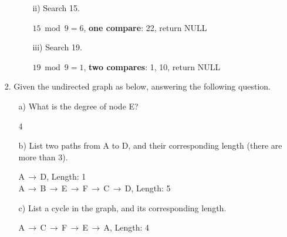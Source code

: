 \documentclass{article}
\begin{document}
\begin{itemize}
\begin{itemize}
\begin{itemize}
            \item[ii)] Search 15.

            $15\bmod{9}=6$, \textbf{one compare}: 22, return NULL
            
            \item[iii)] Search 19.

            $19\bmod{9}=1$, \textbf{two compares}: 1, 10, return NULL
            
        \end{itemize}
    \end{itemize}
    \item[2.] Given the undirected graph as below, answering the following question.
    \begin{center}
    \end{center}
    \begin{itemize}
        \item[a)] What is the degree of node E?

        4
        
        \item[b)] List two paths from A to D, and their corresponding length (there are more than 3).

        A$\,\to\,$D, Length: 1\\
        A$\,\to\,$B$\,\to\,$E$\,\to\,$F$\,\to\,$C$\,\to\,$D, Length: 5        
        \item[c)] List a cycle in the graph, and its corresponding length.

        A$\,\to\,$C$\,\to\,$F$\,\to\,$E$\,\to\,$A, Length: 4
        

\end{itemize}
\end{itemize}
\end{document}
